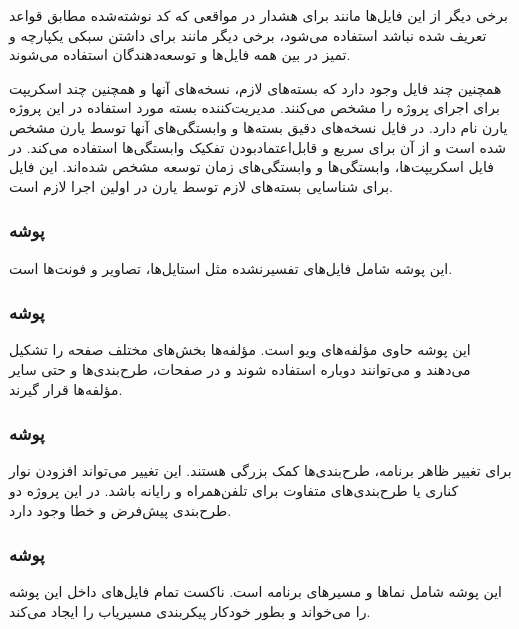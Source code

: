 برخی دیگر از این فایل‌ها مانند  برای هشدار در مواقعی که کد نوشته‌شده مطابق قواعد تعریف شده نباشد استفاده می‌شود، برخی دیگر مانند  برای داشتن سبکی یکپارچه و تمیز در بین همه فایل‌ها و توسعه‌دهندگان استفاده می‌شوند.

همچنین چند فایل وجود دارد که بسته‌های لازم، نسخه‌های آنها و همچنین چند اسکریپت برای اجرای پروژه را مشخص می‌کنند. مدیریت‌کننده بسته مورد استفاده در این پروژه یارن نام دارد. در فایل  نسخه‌های دقیق بسته‌ها و وابستگی‌های آنها توسط یارن مشخص شده است و از آن برای سریع و قابل‌اعتمادبودن تفکیک وابستگی‌ها استفاده می‌کند. در فایل  اسکریپت‌ها، وابستگی‌ها و وابستگی‌های زمان توسعه مشخص شده‌اند. این فایل برای شناسایی بسته‌های لازم توسط یارن در اولین اجرا لازم است.

\subsubsection{پوشه }

این پوشه شامل فایل‌های تفسیرنشده مثل استایل‌ها، تصاویر و فونت‌ها است\cite{nuxt}.

\subsubsection{پوشه }

این پوشه حاوی مؤلفه‌های ویو است. مؤلفه‌ها بخش‌های مختلف صفحه را تشکیل می‌دهند و می‌توانند دوباره استفاده شوند و در صفحات، طرح‌بندی‌ها و حتی سایر مؤلفه‌ها قرار گیرند\cite{nuxt}.

\subsubsection{پوشه }

برای تغییر ظاهر برنامه، طرح‌بندی‌ها کمک بزرگی هستند. این تغییر می‌تواند افزودن نوار کناری یا طرح‌بندی‌های متفاوت برای تلفن‌همراه و رایانه باشد. در این پروژه دو طرح‌بندی پیش‌فرض و خطا وجود دارد\cite{nuxt}.

\subsubsection{پوشه }

این پوشه شامل نماها و مسیرهای برنامه است. ناکست تمام فایل‌های  داخل این پوشه را می‌خواند و بطور خودکار پیکربندی مسیریاب را ایجاد می‌کند\cite{nuxt}.

